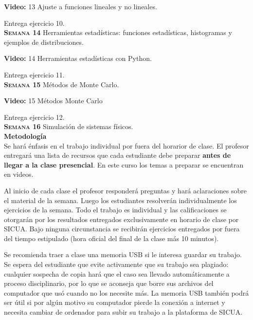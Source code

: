 \documentclass[letterpaper,10pt,onecolumn]{article}
\begin{document}
\textbf{Video:} 13 Ajuste a funciones lineales y no lineales.

Entrega ejercicio 10.
\\[-0.3cm]  

\noindent\textbf{\textsc{Semana 14}} Herramientas
estadísticas: funciones estadísticas, histogramas y ejemplos de
distribuciones.

\textbf{Video:} 14 Herramientas estadísticas con Python.

Entrega ejercicio 11.
\\[-0.3cm] 

\noindent\textbf{\textsc{Semana 15}} Métodos de Monte Carlo.


\textbf{Video:} 15 M\'etodos Monte Carlo 

Entrega ejercicio 12.
\\[-0.3cm] 

\noindent\textbf{\textsc{Semana 16}} Simulaci\'on de sistemas f\'isicos. \\[0.1cm] 


\noindent\textbf{\large {} \quad Metodología}\\[-0.2cm]

\noindent\normalsize Se har\'a \'enfasis en el trabajo individual por
fuera del horarior de clase. El profesor entregar\'a una lista de
recursos que cada estudiante debe preparar {\bf antes de llegar a la
  clase presencial}.   
En este curso los temas a preparar se encuentran en videos.

Al inicio de cada clase el profesor responderá preguntas y 
hará aclaraciones sobre el material de la semana. Luego los
estudiantes resolverán individualmente los ejercicios de la semana.
Todo el trabajo es individual y las calificaciones se otorgar\'an por
los resultados entregados exclusivamente en horario de clase por SICUA. 
Bajo ninguna circunstancia se recibirán ejercicios entregados por fuera 
del tiempo estipulado (hora oficial del final de la clase más 10 minutos).

Se recomienda traer a clase una memoria USB si le interesa guardar su 
trabajo. Se espera del estudiante que evite activamente que
su trabajo sea plagiado: cualquier sospecha de copia hará que el caso sea
llevado automáticamente a proceso disciplinario, por lo que se aconseja
que borre sus archivos del computador que usó cuando no los necesite más.
La memoria USB también podrá ser útil si por algún motivo su computador
pierde la conexión a internet y necesita cambiar de ordenador para subir
su trabajo a la plataforma de SICUA.
\\[0.1cm] 
\end{document}
